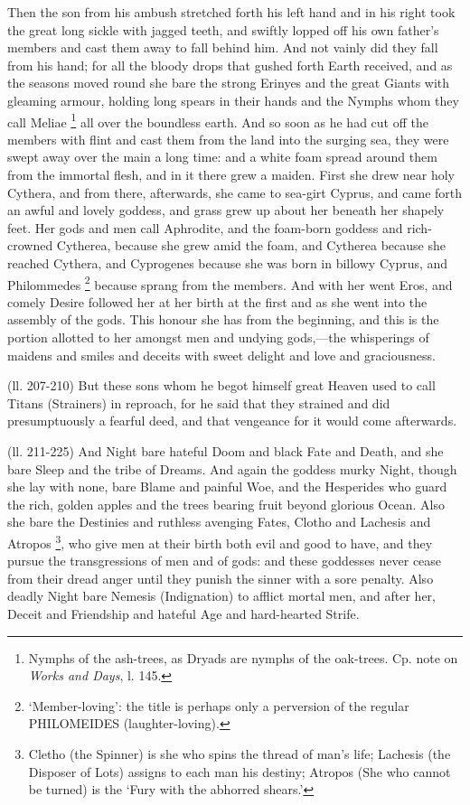 Then the son from his ambush stretched forth his left hand and in his right
took the great long sickle with jagged teeth, and swiftly lopped off his own
father’s members and cast them away to fall behind him. And not vainly
did they fall from his hand; for all the bloody drops that gushed forth Earth
received, and as the seasons moved round she bare the strong Erinyes and the
great Giants with gleaming armour, holding long spears in their hands and the
Nymphs whom they call Meliae \footnote{Nymphs of the ash-trees,
as Dryads are nymphs of the oak-trees. Cp. note on \emph{Works and Days}, l.
145.} all over the boundless earth. And
so soon as he had cut off the members with flint and cast them from the land
into the surging sea, they were swept away over the main a long time: and a
white foam spread around them from the immortal flesh, and in it there grew a
maiden. First she drew near holy Cythera, and from there, afterwards, she came
to sea-girt Cyprus, and came forth an awful and lovely goddess, and grass grew
up about her beneath her shapely feet. Her gods and men call Aphrodite, and the
foam-born goddess and rich-crowned Cytherea, because she grew amid the foam,
and Cytherea because she reached Cythera, and Cyprogenes because she was born
in billowy Cyprus, and Philommedes \footnote{‘Member-loving’: the title is perhaps only a perversion of the
regular PHILOMEIDES (laughter-loving).} because
sprang from the members. And with her went Eros, and comely Desire followed her
at her birth at the first and as she went into the assembly of the gods. This
honour she has from the beginning, and this is the portion allotted to her
amongst men and undying gods,—the whisperings of maidens and smiles and
deceits with sweet delight and love and graciousness.

(ll. 207-210) But these sons whom he begot himself great Heaven used to call
Titans (Strainers) in reproach, for he said that they strained and did
presumptuously a fearful deed, and that vengeance for it would come afterwards.

(ll. 211-225) And Night bare hateful Doom and black Fate and Death, and she
bare Sleep and the tribe of Dreams. And again the goddess murky Night, though
she lay with none, bare Blame and painful Woe, and the Hesperides who guard the
rich, golden apples and the trees bearing fruit beyond glorious Ocean. Also she
bare the Destinies and ruthless avenging Fates, Clotho and Lachesis and Atropos
\footnote{Cletho (the Spinner) is
she who spins the thread of man’s life; Lachesis (the Disposer of Lots)
assigns to each man his destiny; Atropos (She who cannot be turned) is the
‘Fury with the abhorred shears.’}, who give men at their birth both
evil and good to have, and they pursue the transgressions of men and of gods:
and these goddesses never cease from their dread anger until they punish the
sinner with a sore penalty. Also deadly Night bare Nemesis (Indignation) to
afflict mortal men, and after her, Deceit and Friendship and hateful Age and
hard-hearted Strife.

